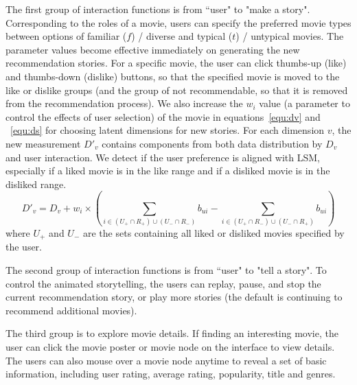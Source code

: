 \documentclass{vgtc}                          %
\begin{document}
The first group of interaction functions is from ``user" to "make a story". 
Corresponding to the roles of a movie, users can specify the preferred movie types between options of familiar ($f$) / diverse and typical ($t$) / untypical movies.
The parameter values become effective immediately on generating the new recommendation stories.
For a specific movie, the user can click thumbs-up (like) and thumbs-down (dislike) buttons, so that the specified movie is moved to the like or dislike groups (and the group of not recommendable, so that it is removed from the recommendation process).
We also increase the $w_i$ value (a parameter to control the effects of user selection) of the movie in equations~\ref{equ:dv} and ~\ref{equ:ds} for choosing latent dimensions for new stories.
For each dimension $v$, the new measurement $D'_v$ contains components from both data distribution by $D_v$ and user interaction. 
We detect if the user preference is aligned with LSM, especially if a liked movie is in the like range and if a disliked movie is in the disliked range.
\begin{equation}
D'_v = D_v  + w_{i} \times (\sum_{i \in (U_+ \cap R_+) \cup (U_- \cap R_-)} {b_{ui}} - \sum_{i \in (U_+ \cap R_-) \cup (U_- \cap R_+)} {b_{ui}})
\end{equation}
where $U_+$ and $U_-$ are the sets containing all liked or disliked movies specified by the user.

The second group of interaction functions is from ``user" to "tell a story". 
To control the animated storytelling, the users can replay, pause, and stop the current recommendation story, or play more stories (the default is continuing to recommend additional movies).

The third group is to explore movie details.
If finding an interesting movie, the user can click the movie poster or movie node on the interface to view details.
The users can also mouse over a movie node anytime to reveal a set of basic information, including user rating, average rating, popularity, title and genres.


\end{document}
